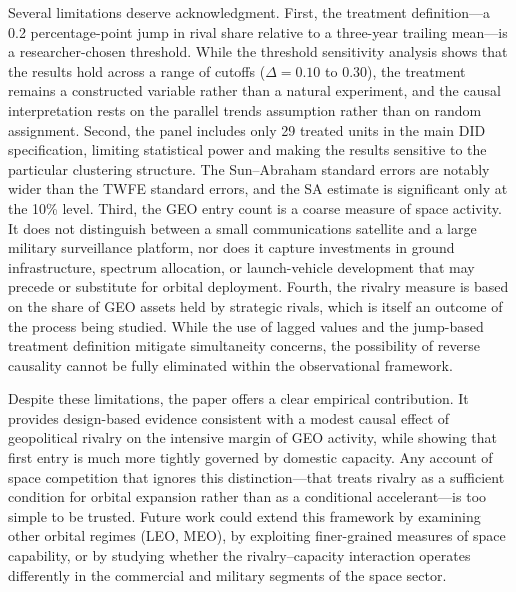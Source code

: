 \documentclass[11pt]{article}
\begin{document}
Several limitations deserve acknowledgment. First, the treatment definition---a 0.2 percentage-point jump in rival share relative to a three-year trailing mean---is a researcher-chosen threshold. While the threshold sensitivity analysis shows that the results hold across a range of cutoffs ($\Delta = 0.10$ to $0.30$), the treatment remains a constructed variable rather than a natural experiment, and the causal interpretation rests on the parallel trends assumption rather than on random assignment. Second, the panel includes only 29 treated units in the main DID specification, limiting statistical power and making the results sensitive to the particular clustering structure. The Sun--Abraham standard errors are notably wider than the TWFE standard errors, and the SA estimate is significant only at the 10\% level. Third, the GEO entry count is a coarse measure of space activity. It does not distinguish between a small communications satellite and a large military surveillance platform, nor does it capture investments in ground infrastructure, spectrum allocation, or launch-vehicle development that may precede or substitute for orbital deployment. Fourth, the rivalry measure is based on the share of GEO assets held by strategic rivals, which is itself an outcome of the process being studied. While the use of lagged values and the jump-based treatment definition mitigate simultaneity concerns, the possibility of reverse causality cannot be fully eliminated within the observational framework.

Despite these limitations, the paper offers a clear empirical contribution. It provides design-based evidence consistent with a modest causal effect of geopolitical rivalry on the intensive margin of GEO activity, while showing that first entry is much more tightly governed by domestic capacity. Any account of space competition that ignores this distinction---that treats rivalry as a sufficient condition for orbital expansion rather than as a conditional accelerant---is too simple to be trusted. Future work could extend this framework by examining other orbital regimes (LEO, MEO), by exploiting finer-grained measures of space capability, or by studying whether the rivalry--capacity interaction operates differently in the commercial and military segments of the space sector.
\end{document}

